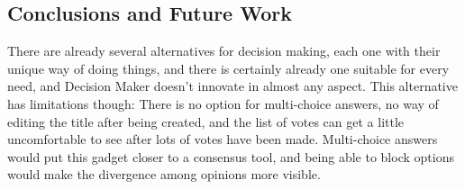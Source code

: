 \subsection{Conclusions and Future Work}
There are already several alternatives for decision making, each one with their unique way of doing things, and there is certainly already one suitable for every need, and Decision Maker doesn't innovate in almost any aspect. This alternative has limitations though: There is no option for multi-choice answers, no way of editing the title after being created, and the list of votes can get a little uncomfortable to see after lots of votes have been made. Multi-choice answers would put this gadget closer to a consensus tool, and being able to block options would make the divergence among opinions more visible.
